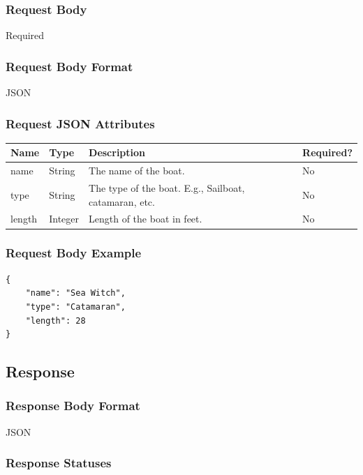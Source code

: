 \documentclass[letterpaper,11pt,titlepage,draftclsnofoot,onecolumn,compsoc,utf8,latin1]{IEEEtran}
\begin{document}
\begin{singlespace}
\subsubsection{Request Body}

Required

\subsubsection{Request Body Format}

JSON

\subsubsection{Request JSON Attributes}

\begin{center}
\begin{tabular}{ |p{}|p{}|p{}|p{}| } 
 \hline
 \textbf{Name} & \textbf{Type} & \textbf{Description} & \textbf{Required?} \\  \hline
 name & String & The name of the boat. & No  \\ \hline
 type & String & The type of the boat. E.g., Sailboat, catamaran, etc. & No \\ \hline 
 length & Integer & Length of the boat in feet. & No \\ 
 \hline
\end{tabular}
\end{center}

\subsubsection{Request Body Example}

\begin{lstlisting}[]
{
    "name": "Sea Witch",
    "type": "Catamaran",
    "length": 28
}
\end{lstlisting}

\subsection{Response}
\subsubsection{Response Body Format}

JSON

\subsubsection{Response Statuses}


\end{singlespace}
\end{document}
